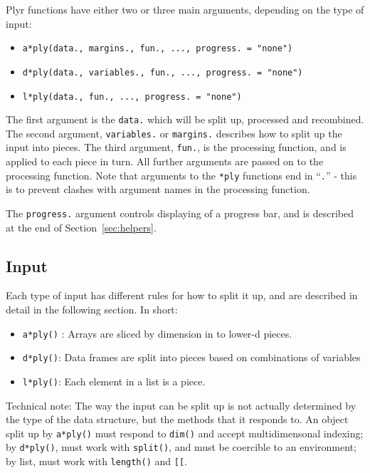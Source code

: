 \documentclass[letterpage]{scrartcl}
\newcommand{\code}[1]{\lstinline!#1!}
\newcommand{\f}[1]{\lstinline!#1()!}
\begin{document}
Plyr functions have either two or three main arguments, depending on the type of input:

\begin{itemize}
  \item {\tt a*ply(data., margins., fun., ..., progress. = "none")}
  \item {\tt d*ply(data., variables., fun., ..., progress. = "none")}
  \item {\tt l*ply(data., fun., ..., progress. = "none")}
\end{itemize}

The first argument is the {\tt data.} which will be split up, processed and recombined.  The second argument, \code{variables.} or \code{margins.} describes how to split up the input into pieces.  The third argument, \code{fun.}, is the processing function, and is applied to each piece in turn.  All further arguments are passed on to the processing function.  Note that arguments to the {\tt **ply} functions end in  ``{\tt .}'' - this is to prevent clashes with argument names in the processing function.

The {\tt progress.} argument controls displaying of a progress bar, and is described at the end of Section~\ref{sec:helpers}.

\subsection{Input} 
\label{sec:input}

Each type of input has different rules for how to split it up, and are described in detail in the following section. In short:

\begin{itemize}
  \item \f{a*ply} : Arrays are sliced by dimension in to lower-d pieces. 
  
  \item \f{d*ply}: Data frames are split into pieces based on combinations of variables
  
  \item \f{l*ply}: Each element in a list is a piece.
  
\end{itemize}

Technical note: The way the input can be split up is not actually determined by the type of the data structure, but the methods that it responds to.  An object split up by \f{a*ply} must respond to \f{dim} and accept multidimensonal indexing; by \f{d*ply}, must work with \f{split}, and must be coercible to an environment; by list, must work with \f{length} and \code{[[}.
\end{document}
